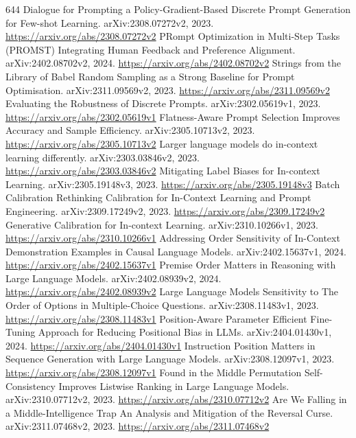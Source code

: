 \documentclass[11pt]{article}
\begin{document}
\begin{thebibliography}{644}
 Dialogue for Prompting a Policy-Gradient-Based Discrete Prompt Generation for Few-shot Learning. arXiv:2308.07272v2, 2023. \url{https://arxiv.org/abs/2308.07272v2}
 PRompt Optimization in Multi-Step Tasks (PROMST) Integrating Human Feedback and Preference Alignment. arXiv:2402.08702v2, 2024. \url{https://arxiv.org/abs/2402.08702v2}
 Strings from the Library of Babel Random Sampling as a Strong Baseline for Prompt Optimisation. arXiv:2311.09569v2, 2023. \url{https://arxiv.org/abs/2311.09569v2}
 Evaluating the Robustness of Discrete Prompts. arXiv:2302.05619v1, 2023. \url{https://arxiv.org/abs/2302.05619v1}
 Flatness-Aware Prompt Selection Improves Accuracy and Sample Efficiency. arXiv:2305.10713v2, 2023. \url{https://arxiv.org/abs/2305.10713v2}
 Larger language models do in-context learning differently. arXiv:2303.03846v2, 2023. \url{https://arxiv.org/abs/2303.03846v2}
 Mitigating Label Biases for In-context Learning. arXiv:2305.19148v3, 2023. \url{https://arxiv.org/abs/2305.19148v3}
 Batch Calibration Rethinking Calibration for In-Context Learning and Prompt Engineering. arXiv:2309.17249v2, 2023. \url{https://arxiv.org/abs/2309.17249v2}
 Generative Calibration for In-context Learning. arXiv:2310.10266v1, 2023. \url{https://arxiv.org/abs/2310.10266v1}
 Addressing Order Sensitivity of In-Context Demonstration Examples in Causal Language Models. arXiv:2402.15637v1, 2024. \url{https://arxiv.org/abs/2402.15637v1}
 Premise Order Matters in Reasoning with Large Language Models. arXiv:2402.08939v2, 2024. \url{https://arxiv.org/abs/2402.08939v2}
 Large Language Models Sensitivity to The Order of Options in Multiple-Choice Questions. arXiv:2308.11483v1, 2023. \url{https://arxiv.org/abs/2308.11483v1}
 Position-Aware Parameter Efficient Fine-Tuning Approach for Reducing Positional Bias in LLMs. arXiv:2404.01430v1, 2024. \url{https://arxiv.org/abs/2404.01430v1}
 Instruction Position Matters in Sequence Generation with Large Language Models. arXiv:2308.12097v1, 2023. \url{https://arxiv.org/abs/2308.12097v1}
 Found in the Middle Permutation Self-Consistency Improves Listwise Ranking in Large Language Models. arXiv:2310.07712v2, 2023. \url{https://arxiv.org/abs/2310.07712v2}
 Are We Falling in a Middle-Intelligence Trap An Analysis and Mitigation of the Reversal Curse. arXiv:2311.07468v2, 2023. \url{https://arxiv.org/abs/2311.07468v2}

\end{thebibliography}
\end{document}
